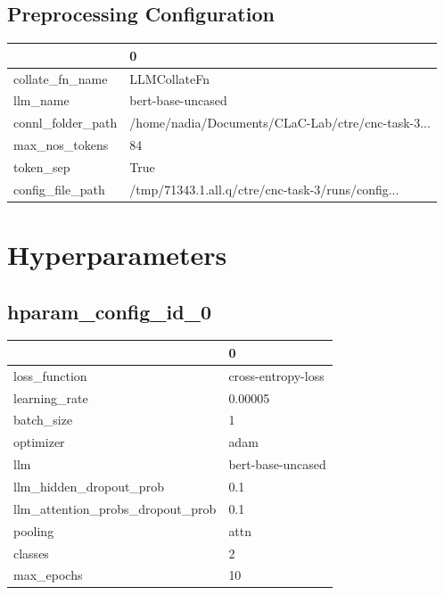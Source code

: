 \documentclass{article}
\begin{document}
\subsection{Preprocessing Configuration}
\begin{tabular}{ll}
\toprule
{} &                                                  0 \\
\midrule
collate\_fn\_name   &                                       LLMCollateFn \\
llm\_name          &                                  bert-base-uncased \\
connl\_folder\_path &  /home/nadia/Documents/CLaC-Lab/ctre/cnc-task-3... \\
max\_nos\_tokens    &                                                 84 \\
token\_sep         &                                               True \\
config\_file\_path  &  /tmp/71343.1.all.q/ctre/cnc-task-3/runs/config... \\
\bottomrule
\end{tabular}

\section{Hyperparameters}
\subsection{hparam\_config\_id\_0}
\begin{tabular}{ll}
\toprule
{} &                   0 \\
\midrule
loss\_function                    &  cross-entropy-loss \\
learning\_rate                    &             0.00005 \\
batch\_size                       &                   1 \\
optimizer                        &                adam \\
llm                              &   bert-base-uncased \\
llm\_hidden\_dropout\_prob          &                 0.1 \\
llm\_attention\_probs\_dropout\_prob &                 0.1 \\
pooling                          &                attn \\
classes                          &                   2 \\
max\_epochs                       &                  10 \\
\bottomrule
\end{tabular}
\end{document}
